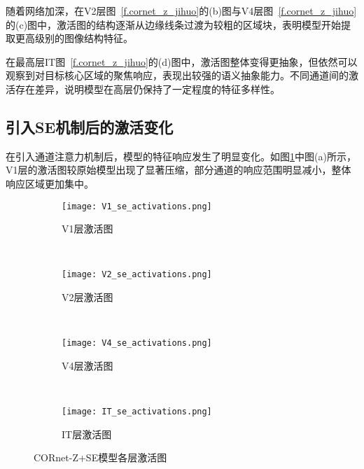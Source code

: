 随着网络加深，在V2层图~\ref{f.cornet_z_jihuo}的(b)图与V4层图~\ref{f.cornet_z_jihuo}的(c)图中，激活图的结构逐渐从边缘线条过渡为较粗的区域块，表明模型开始提取更高级别的图像结构特征。

在最高层IT图~\ref{f.cornet_z_jihuo}的(d)图中，激活图整体变得更抽象，但依然可以观察到对目标核心区域的聚焦响应，表现出较强的语义抽象能力。不同通道间的激活存在差异，说明模型在高层仍保持了一定程度的特征多样性。

\subsection{引入SE机制后的激活变化}

在引入通道注意力机制后，模型的特征响应发生了明显变化。如图\ref{f.cornet_z_se_jihuo}中图(a)所示，V1层的激活图较原始模型出现了显著压缩，部分通道的响应范围明显减小，整体响应区域更加集中。

\begin{figure}[!htb]
	\centering
	\begin{subfigure}[t]{0.8\linewidth}
		\captionsetup{justification=centering}
		\begin{minipage}[b]{1\linewidth}
			\texttt{[image: V1\_se\_activations.png]}
			\caption{V1层激活图}
		\end{minipage}
	\end{subfigure}\\
	\begin{subfigure}[t]{0.8\linewidth}
		\captionsetup{justification=centering}
		\begin{minipage}[b]{1\linewidth}
			\texttt{[image: V2\_se\_activations.png]}
			\caption{V2层激活图}
		\end{minipage}
	\end{subfigure}\\
	\begin{subfigure}[t]{0.8\linewidth}
		\captionsetup{justification=centering}
		\begin{minipage}[b]{1\linewidth}
			\texttt{[image: V4\_se\_activations.png]}
			\caption{V4层激活图}
		\end{minipage}
	\end{subfigure}\\
	\begin{subfigure}[t]{0.8\linewidth}
		\captionsetup{justification=centering}
		\begin{minipage}[b]{1\linewidth}
			\texttt{[image: IT\_se\_activations.png]}
			\caption{IT层激活图}
		\end{minipage}
	\end{subfigure}
	\caption{CORnet-Z+SE模型各层激活图}
	\label{f.cornet_z_se_jihuo}
\end{figure}

